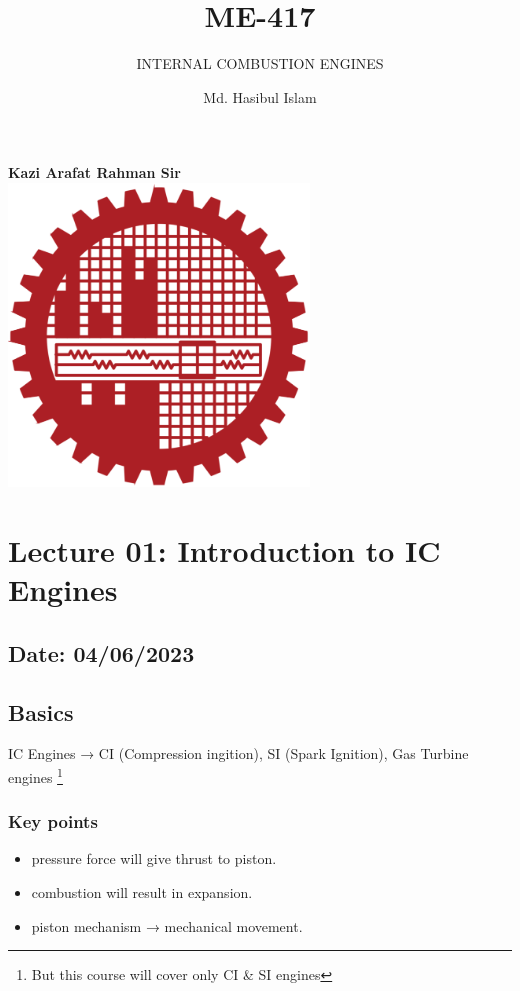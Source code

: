 \documentclass{article}
\title{ME-417}
\author{Md. Hasibul Islam}
\subtitle{INTERNAL COMBUSTION ENGINES}
\begin{document}
\begin{titlepage}
    \centering
    
    {\Huge\bfseries\maketitle}
    \textbf{Kazi Arafat Rahman Sir} \\
    \vspace{2cm}
    \includegraphics[width=8cm]{institution_logo.jpg}
    \vfill
    \vspace*{2cm}
\end{titlepage}

\tableofcontents
\pagebreak
\section{Lecture 01: Introduction to IC Engines} 
\subsection*{\hfill Date: 04/06/2023}

\subsection*{Basics}
IC Engines → CI (Compression ingition), SI (Spark Ignition), Gas Turbine engines \footnote{But this course will cover only CI \& SI engines}\\

\subsubsection*{Key points}
\begin{itemize}
	\item pressure force will give thrust to piston.
	\item combustion will result in expansion.
	\item piston mechanism → mechanical movement.
\end{itemize}
\end{document}
